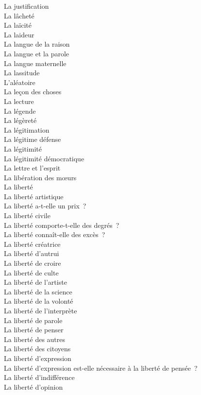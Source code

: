 \documentclass[a4paper,12pt]{article}
\begin{document}
La justification \\
La lâcheté \\
La laïcité \\
La laideur \\
La langue de la raison \\
La langue et la parole \\
La langue maternelle \\
La lassitude \\
L'aléatoire \\
La leçon des choses \\
La lecture \\
La légende \\
La légèreté \\
La légitimation \\
La légitime défense \\
La légitimité \\
La légitimité démocratique \\
La lettre et l'esprit \\
La libération des mœurs \\
La liberté \\
La liberté artistique \\
La liberté a-t-elle un prix ? \\
La liberté civile \\
La liberté comporte-t-elle des degrés ? \\
La liberté connaît-elle des excès ? \\
La liberté créatrice \\
La liberté d'autrui \\
La liberté de croire \\
La liberté de culte \\
La liberté de l'artiste \\
La liberté de la science \\
La liberté de la volonté \\
La liberté de l'interprète \\
La liberté de parole \\
La liberté de penser \\
La liberté des autres \\
La liberté des citoyens \\
La liberté d'expression \\
La liberté d'expression est-elle nécessaire à la liberté de pensée ? \\
La liberté d'indifférence \\
La liberté d'opinion \\
\end{document}
